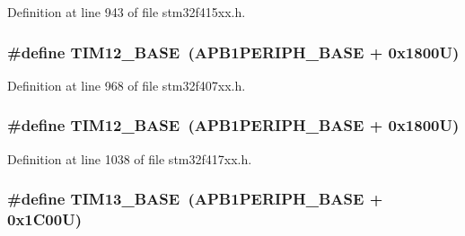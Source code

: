 Definition at line 943 of file stm32f415xx.\+h.

\subsubsection[{\texorpdfstring{T\+I\+M12\+\_\+\+B\+A\+SE}{TIM12_BASE}}]{\setlength{\rightskip}{0pt plus 5cm}\#define T\+I\+M12\+\_\+\+B\+A\+SE~({\bf A\+P\+B1\+P\+E\+R\+I\+P\+H\+\_\+\+B\+A\+SE} + 0x1800\+U)}\hypertarget{group___peripheral__registers__structures_ga33dea32fadbaecea161c2ef7927992fd}{}\label{group___peripheral__registers__structures_ga33dea32fadbaecea161c2ef7927992fd}


Definition at line 968 of file stm32f407xx.\+h.

\subsubsection[{\texorpdfstring{T\+I\+M12\+\_\+\+B\+A\+SE}{TIM12_BASE}}]{\setlength{\rightskip}{0pt plus 5cm}\#define T\+I\+M12\+\_\+\+B\+A\+SE~({\bf A\+P\+B1\+P\+E\+R\+I\+P\+H\+\_\+\+B\+A\+SE} + 0x1800\+U)}\hypertarget{group___peripheral__registers__structures_ga33dea32fadbaecea161c2ef7927992fd}{}\label{group___peripheral__registers__structures_ga33dea32fadbaecea161c2ef7927992fd}


Definition at line 1038 of file stm32f417xx.\+h.

\subsubsection[{\texorpdfstring{T\+I\+M13\+\_\+\+B\+A\+SE}{TIM13_BASE}}]{\setlength{\rightskip}{0pt plus 5cm}\#define T\+I\+M13\+\_\+\+B\+A\+SE~({\bf A\+P\+B1\+P\+E\+R\+I\+P\+H\+\_\+\+B\+A\+SE} + 0x1\+C00\+U)}\hypertarget{group___peripheral__registers__structures_gad20f79948e9359125a40bbf6ed063590}{}\label{group___peripheral__registers__structures_gad20f79948e9359125a40bbf6ed063590}


